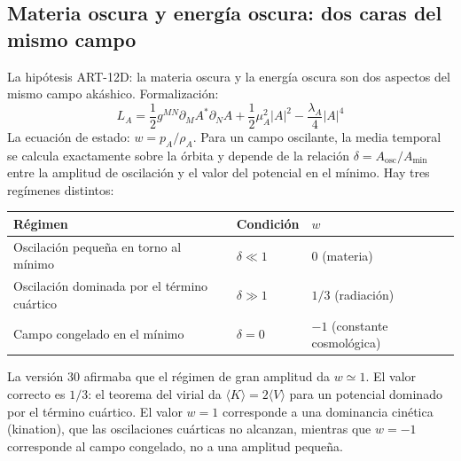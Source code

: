 \subsection{Materia oscura y energía oscura: dos caras del mismo campo}
La hipótesis ART-12D: la materia oscura y la energía oscura son dos aspectos del mismo campo akáshico. Formalización:
\begin{equation}
L_A = \frac{1}{2} g^{MN} \partial_M A^* \partial_N A + \frac{1}{2} \mu_A^2 |A|^2 - \frac{\lambda_A}{4} |A|^4
\end{equation}
La ecuación de estado: $w = p_A / \rho_A$. Para un campo oscilante, la media temporal se calcula exactamente sobre la órbita y depende de la relación $\delta = A_{\text{osc}}/A_{\min}$ entre la amplitud de oscilación y el valor del potencial en el mínimo. Hay tres regímenes distintos:
\begin{center}
\begin{tabular}{@{}lll@{}}
\toprule
\textbf{Régimen} & \textbf{Condición} & $w$ \\ \midrule
Oscilación pequeña en torno al mínimo & $\delta \ll 1$ & $0$ (materia) \\
Oscilación dominada por el término cuártico & $\delta \gg 1$ & $1/3$ (radiación) \\
Campo congelado en el mínimo & $\delta = 0$ & $-1$ (constante cosmológica) \\ \bottomrule
\end{tabular}
\end{center}
La versión 30 afirmaba que el régimen de gran amplitud da $w \simeq 1$. El valor correcto es $1/3$: el teorema del virial da $\langle K \rangle = 2\langle V \rangle$ para un potencial dominado por el término cuártico. El valor $w = 1$ corresponde a una dominancia cinética (kination), que las oscilaciones cuárticas no alcanzan, mientras que $w = -1$ corresponde al campo congelado, no a una amplitud pequeña.
